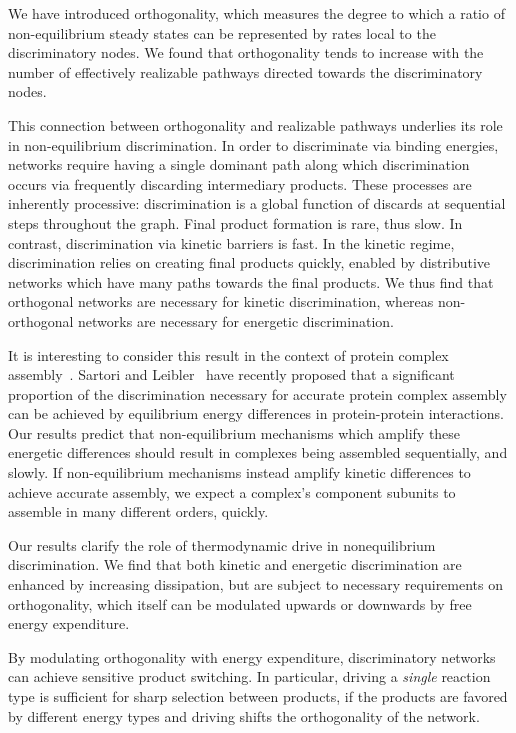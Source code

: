 We have introduced orthogonality, which measures the degree to which a ratio of non-equilibrium steady states can be represented by rates local to the discriminatory nodes.  We found that orthogonality tends to increase with the number of effectively realizable pathways directed towards the discriminatory nodes.

This connection between orthogonality and realizable pathways underlies its role in non-equilibrium discrimination.  In order to discriminate via binding energies, networks require having a single dominant path along which discrimination occurs via frequently discarding intermediary products.  These processes are inherently processive: discrimination is a global function of discards at sequential steps throughout the graph.  Final product formation is rare, thus slow.  In contrast, discrimination via kinetic barriers is fast.  In the kinetic regime, discrimination relies on creating final products quickly, enabled by distributive networks which have many paths towards the final products.  We thus find that orthogonal networks are necessary for kinetic discrimination, whereas non-orthogonal networks are necessary for energetic discrimination.

It is interesting to consider this result in the context of protein complex assembly~\cite{Murugan2014a}.  Sartori and Leibler~\cite{Sartori2019} have recently proposed that a significant proportion of the discrimination necessary for accurate protein complex assembly can be achieved by equilibrium energy differences in protein-protein interactions.  Our results predict that non-equilibrium mechanisms which amplify these energetic differences should result in complexes being assembled sequentially, and slowly.  If non-equilibrium mechanisms instead amplify kinetic differences to achieve accurate assembly, we expect a complex's component subunits to assemble in many different orders, quickly.

Our results clarify the role of thermodynamic drive in nonequilibrium discrimination.  We find that both kinetic and energetic discrimination are enhanced by increasing dissipation, but are subject to necessary requirements on orthogonality, which itself can be modulated upwards or downwards by free energy expenditure.

By modulating orthogonality with energy expenditure, discriminatory networks can achieve sensitive product switching.  In particular, driving a {\it single} reaction type is sufficient for sharp selection between products, if the products are favored by different energy types and driving shifts the orthogonality of the network.

